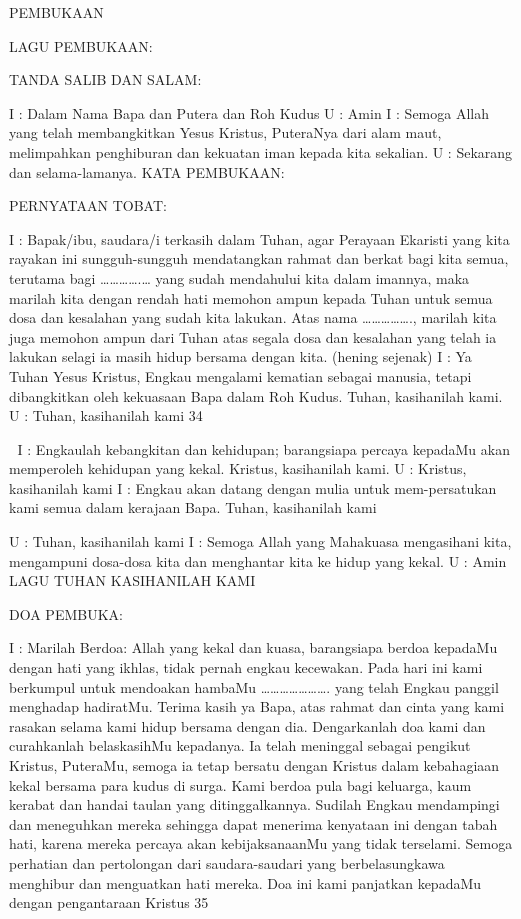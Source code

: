 \documentclass[10pt,a5paper,fancyhdr]{memoir}
\begin{document}
PEMBUKAAN 

LAGU PEMBUKAAN: 

TANDA SALIB DAN SALAM: 

I : Dalam Nama Bapa dan Putera dan Roh Kudus 
U : Amin 
I : Semoga Allah yang telah membangkitkan Yesus Kristus, 
PuteraNya dari alam maut, melimpahkan penghiburan dan kekuatan 
iman kepada kita sekalian. 
U : Sekarang dan selama-lamanya. 
KATA PEMBUKAAN: 

PERNYATAAN TOBAT: 

I : Bapak/ibu, saudara/i terkasih dalam Tuhan, agar Perayaan Ekaristi 
yang kita rayakan ini sungguh-sungguh mendatangkan rahmat dan 
berkat bagi kita semua, terutama bagi ………….… yang sudah 
mendahului kita dalam imannya, maka marilah kita dengan rendah 
hati memohon ampun kepada Tuhan untuk semua dosa dan kesalahan 
yang sudah kita lakukan. Atas nama ……………., marilah kita juga 
memohon ampun dari Tuhan atas segala dosa dan kesalahan yang 
telah ia lakukan selagi ia masih hidup bersama dengan kita. 
(hening sejenak) 
I : Ya Tuhan Yesus Kristus, Engkau mengalami kematian sebagai 
manusia, tetapi dibangkitkan oleh kekuasaan Bapa dalam Roh Kudus. 
Tuhan, kasihanilah kami. 
U : Tuhan, kasihanilah kami 
34 



I : Engkaulah kebangkitan dan kehidupan; barangsiapa percaya 
kepadaMu akan memperoleh kehidupan yang kekal. Kristus, 
kasihanilah kami. 
U : Kristus, kasihanilah kami 
I : Engkau akan datang dengan mulia untuk mem-persatukan kami 
semua dalam kerajaan Bapa. 
Tuhan, kasihanilah kami 

U : Tuhan, kasihanilah kami 
I : Semoga Allah yang Mahakuasa mengasihani kita, mengampuni 
dosa-dosa kita dan menghantar kita ke hidup yang kekal. 
U : Amin 
LAGU TUHAN KASIHANILAH KAMI 

DOA PEMBUKA: 

I : Marilah Berdoa: 
Allah yang kekal dan kuasa, barangsiapa berdoa kepadaMu dengan 
hati yang ikhlas, tidak pernah engkau kecewakan. Pada hari ini kami 
berkumpul untuk mendoakan hambaMu …………………. yang telah 
Engkau panggil menghadap hadiratMu. Terima kasih ya Bapa, atas 
rahmat dan cinta yang kami rasakan selama kami hidup bersama 
dengan dia. Dengarkanlah doa kami dan curahkanlah belaskasihMu 
kepadanya. Ia telah meninggal sebagai pengikut Kristus, PuteraMu, 
semoga ia tetap bersatu dengan Kristus dalam kebahagiaan kekal 
bersama para kudus di surga. 
Kami berdoa pula bagi keluarga, kaum kerabat dan handai taulan 
yang ditinggalkannya. Sudilah Engkau mendampingi dan 
meneguhkan mereka sehingga dapat menerima kenyataan ini dengan 
tabah hati, karena mereka percaya akan kebijaksanaanMu yang tidak 
terselami. Semoga perhatian dan pertolongan dari saudara-saudari 
yang berbelasungkawa menghibur dan menguatkan hati mereka. Doa 
ini kami panjatkan kepadaMu dengan pengantaraan Kristus 
35 
\end{document}
